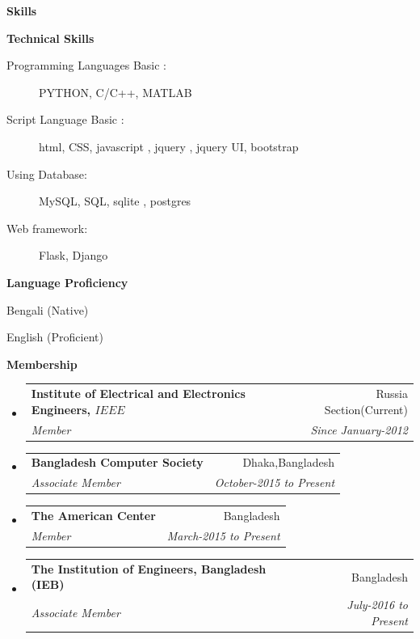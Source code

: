 \documentclass[letterpaper,10pt]{article}
\makeatletter
\newcommand{\resitem}[1]{\item #1 \vspace{-2pt}}
\newcommand{\resheading}[1]{{\large \colorbox{mygrey}{\begin{minipage}{\textwidth}{\textbf{#1 \vphantom{p\^{E}}}}\end{minipage}}}}
\newcommand{\ressubheading}[4]{
\begin{tabular*}{6.5in}{l@{\extracolsep{\fill}}r}
		\textbf{#1} & #2 \\
		\textit{#3} & \textit{#4} \\
\end{tabular*}\vspace{-6pt}}
\makeatother
\begin{document}






\resheading{Skills}

\begin{description}
\item
\resitem{\textbf{Technical Skills}}
\begin{description}
\item[Programming Languages Basic :] PYTHON, C/C++, MATLAB
\item[Script Language Basic :] html, CSS, javascript , jquery , jquery UI, bootstrap
\item[Using Database:] MySQL, SQL, sqlite , postgres 
\item[Web framework:] Flask, Django
\end{description}
\item
\resitem{\textbf{Language Proficiency}}
\begin{description}
\item{Bengali (Native)}
\item{English (Proficient)}
\end{description}
\end{description}

 \resheading{Membership}
 \begin{itemize}
 \item
 \ressubheading{Institute of Electrical and Electronics Engineers, \(IEEE\)}{Russia Section(Current)}{Member}{Since January-2012}


 \item
 \ressubheading{Bangladesh Computer Society}{Dhaka,Bangladesh }{Associate Member}{October-2015 to Present}
 \item
 \ressubheading{The American Center}{Bangladesh}{Member}{March-2015 to Present }
 \item
 \ressubheading{ The Institution of Engineers, Bangladesh (IEB)}{Bangladesh}{Associate Member}{July-2016 to Present }

 \end{itemize}
\end{document}
